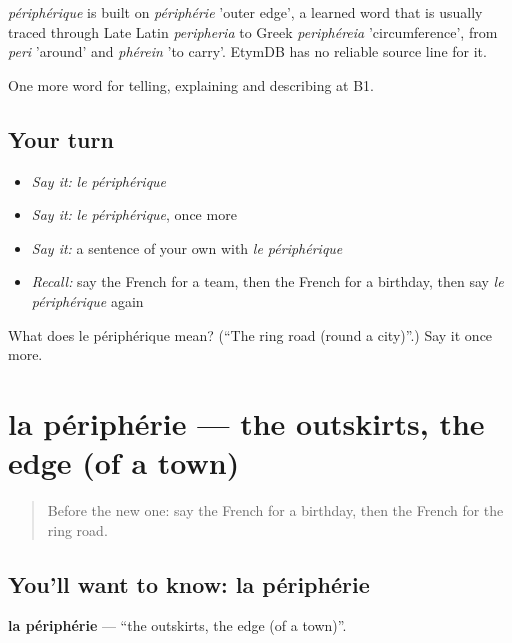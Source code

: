 \begin{cousinweb}
\emph{périphérique} is built on \emph{périphérie} 'outer edge', a learned word that is usually traced through Late Latin \emph{peripheria} to Greek \emph{periphéreia} 'circumference', from \emph{peri} 'around' and \emph{phérein} 'to carry'. EtymDB has no reliable source line for it.
\end{cousinweb}

\begin{grammarlens}[title={What you've built}]
One more word for telling, explaining and describing at B1.
\end{grammarlens}

\subsection*{Your turn}
\begin{itemize}
\raggedright
  \item \emph{Say it:} \emph{le périphérique}
  \item \emph{Say it:} \emph{le périphérique}, once more
  \item \emph{Say it:} a sentence of your own with \emph{le périphérique}
  \item \emph{Recall:} say the French for a team, then the French for a birthday, then say \emph{le périphérique} again
\end{itemize}

\begin{tcolorbox}[breakable,colback=teal!4,colframe=teal!35!black,title={Before you move on}]
What does le périphérique mean? (\textquotedblleft{}The ring road (round a city)\textquotedblright{}.) Say it once more.
\end{tcolorbox}
\section[la périphérie]{la périphérie — the outskirts, the edge (of a town)}

\label{lesson:FR-C400-peripherie}



\begin{quote}
Before the new one: say the French for a birthday, then the French for the ring road.
\end{quote}

\subsection*{You'll want to know: la périphérie}
\textbf{la périphérie} — \textquotedblleft{}the outskirts, the edge (of a town)\textquotedblright{}.

